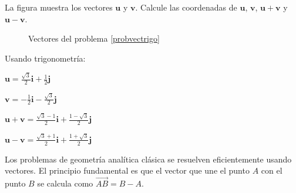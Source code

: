 \begin{prob}\label{probvectrigo}  
La figura muestra los vectores $\mathbf{u}$ y $\mathbf{v}$. Calcule las coordenadas de $\mathbf{u}$, $\mathbf{v}$, $\mathbf{u}+\mathbf{v}$ y $\mathbf{u}-\mathbf{v}$.

\begin{multicols}{2}
\begin{figure}[H]
\centering
{}
\caption{Vectores del problema \ref{probvectrigo}}
\end{figure}

\columnbreak			

\begin{myproof}	
Usando trigonometría:		

$\mathbf{u} = \frac{\sqrt{3}}{2}\mathbf{i} + \frac{1}{2}\mathbf{j}$

$\mathbf{v} = -\frac{1}{2}\mathbf{i} - \frac{\sqrt{3}}{2}\mathbf{j}$

$\mathbf{u}+\mathbf{v} = \frac{\sqrt{3}-1}{2}\mathbf{i} + \frac{1-\sqrt{3}}{2}\mathbf{j}$

$\mathbf{u}-\mathbf{v} = \frac{\sqrt{3}+1}{2}\mathbf{i} + \frac{1+\sqrt{3}}{2}\mathbf{j}$
\end{myproof}
\end{multicols}	
\end{prob}

Los problemas de geometría analítica clásica se resuelven eficientemente usando vectores. El principio fundamental es que el vector que une el punto $A$ con el punto $B$ se calcula como $\overrightarrow{AB} = B - A$.

